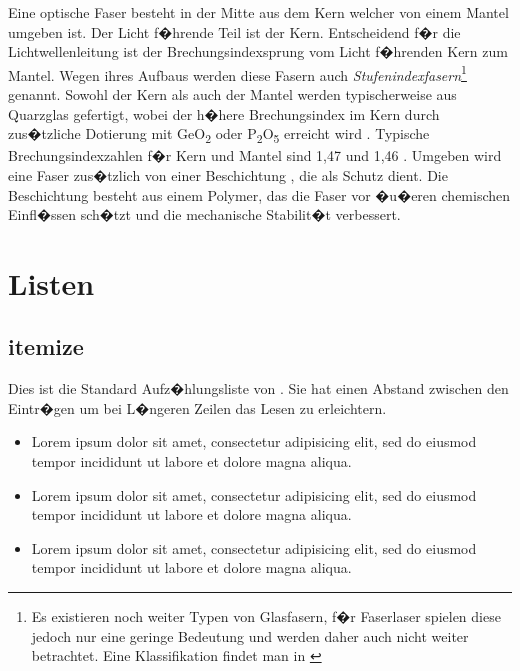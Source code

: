 Eine optische Faser besteht in der Mitte aus dem Kern  welcher von einem Mantel  umgeben ist. Der Licht f�hrende Teil ist der Kern. Entscheidend f�r die Lichtwellenleitung ist der Brechungsindexsprung vom Licht f�hrenden Kern zum Mantel.
Wegen ihres Aufbaus werden diese Fasern auch \emph{Stufenindexfasern}\footnote{Es existieren noch weiter Typen  von Glasfasern, f�r Faserlaser spielen diese jedoch nur eine geringe Bedeutung und werden daher auch nicht weiter betrachtet. Eine Klassifikation findet man in \cite{Yeh}} genannt.
Sowohl der Kern als auch der Mantel werden typischerweise aus Quarzglas gefertigt, wobei der h�here Brechungsindex im Kern durch zus�tzliche Dotierung mit GeO\textsubscript{2} oder P\textsubscript{2}O\textsubscript{5} erreicht wird \cite{Agrawal}.
Typische Brechungsindexzahlen f�r Kern und Mantel sind 1,47 und 1,46 \cite{GuidetofiberOptics}.
Umgeben wird eine Faser zus�tzlich von einer Beschichtung , die als Schutz dient.
Die Beschichtung besteht aus einem Polymer, das die Faser vor �u�eren chemischen Einfl�ssen sch�tzt und die mechanische Stabilit�t verbessert.

\section{Listen}

\subsection{itemize}
Dies ist die Standard Aufz�hlungsliste von \LaTeXe. Sie hat einen Abstand
zwischen den Eintr�gen um bei L�ngeren Zeilen das Lesen zu erleichtern.

\begin{itemize}
   \item Lorem ipsum dolor sit amet, consectetur adipisicing elit, sed do eiusmod tempor
         incididunt ut labore et dolore magna aliqua.
   \item Lorem ipsum dolor sit amet, consectetur adipisicing elit, sed do eiusmod tempor
         incididunt ut labore et dolore magna aliqua.
   \item Lorem ipsum dolor sit amet, consectetur adipisicing elit, sed do eiusmod tempor
         incididunt ut labore et dolore magna aliqua.
\end{itemize}

